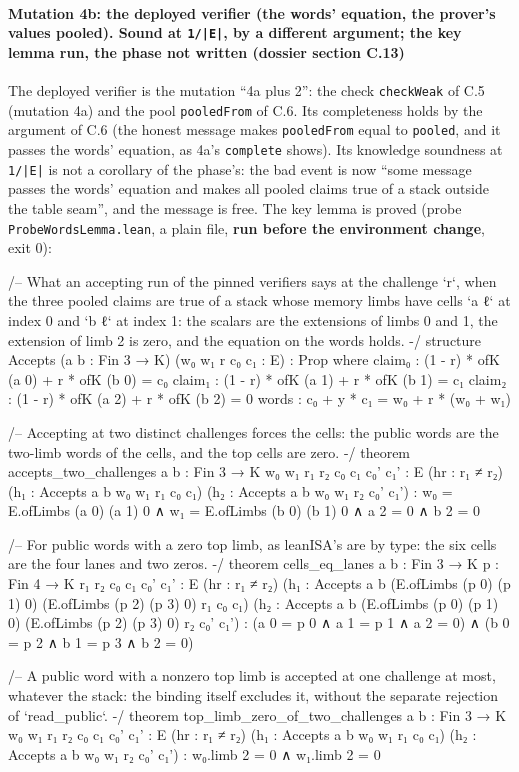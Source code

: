 \paragraph{Mutation 4b: the deployed verifier (the words' equation, the prover's values pooled). Sound at \texttt{1/\allowbreak{}|E|}, by a different argument; the key lemma run, the phase not written (dossier section C.13)}\label{sec:gen-pubinput-C13}

The deployed verifier is the mutation \enquote{4a plus 2}: the check \texttt{checkWeak} of C.5 (mutation 4a) and the pool \texttt{pooledFrom} of C.6. Its completeness holds by the argument of C.6 (the honest message makes \texttt{pooledFrom} equal to \texttt{pooled}, and it passes the words' equation, as 4a's \texttt{complete} shows). Its knowledge soundness at \texttt{1/\allowbreak{}|E|} is not a corollary of the phase's: the bad event is now \enquote{some message passes the words' equation and makes all pooled claims true of a stack outside the table seam}, and the message is free. The key lemma is proved (probe \texttt{ProbeWordsLemma.\allowbreak{}lean}, a plain file, \textbf{run before the environment change}, exit 0):

\begin{leancode}
/-- What an accepting run of the pinned verifiers says at the challenge `r`, when the three
pooled claims are true of a stack whose memory limbs have cells `a ℓ` at index 0 and `b ℓ` at
index 1: the scalars are the extensions of limbs 0 and 1, the extension of limb 2 is zero, and
the equation on the words holds. -/
structure Accepts (a b : Fin 3 → K) (w₀ w₁ r c₀ c₁ : E) : Prop where
  claim₀ : (1 - r) * ofK (a 0) + r * ofK (b 0) = c₀
  claim₁ : (1 - r) * ofK (a 1) + r * ofK (b 1) = c₁
  claim₂ : (1 - r) * ofK (a 2) + r * ofK (b 2) = 0
  words : c₀ + y * c₁ = w₀ + r * (w₀ + w₁)

/-- Accepting at two distinct challenges forces the cells: the public words are the two-limb
words of the cells, and the top cells are zero. -/
theorem accepts_two_challenges {a b : Fin 3 → K} {w₀ w₁ r₁ r₂ c₀ c₁ c₀' c₁' : E}
    (hr : r₁ ≠ r₂) (h₁ : Accepts a b w₀ w₁ r₁ c₀ c₁) (h₂ : Accepts a b w₀ w₁ r₂ c₀' c₁') :
    w₀ = E.ofLimbs (a 0) (a 1) 0 ∧ w₁ = E.ofLimbs (b 0) (b 1) 0 ∧ a 2 = 0 ∧ b 2 = 0

/-- For public words with a zero top limb, as leanISA's are by type: the six cells are the four
lanes and two zeros. -/
theorem cells_eq_lanes {a b : Fin 3 → K} {p : Fin 4 → K} {r₁ r₂ c₀ c₁ c₀' c₁' : E}
    (hr : r₁ ≠ r₂)
    (h₁ : Accepts a b (E.ofLimbs (p 0) (p 1) 0) (E.ofLimbs (p 2) (p 3) 0) r₁ c₀ c₁)
    (h₂ : Accepts a b (E.ofLimbs (p 0) (p 1) 0) (E.ofLimbs (p 2) (p 3) 0) r₂ c₀' c₁') :
    (a 0 = p 0 ∧ a 1 = p 1 ∧ a 2 = 0) ∧ (b 0 = p 2 ∧ b 1 = p 3 ∧ b 2 = 0)

/-- A public word with a nonzero top limb is accepted at one challenge at most, whatever the
stack: the binding itself excludes it, without the separate rejection of `read_public`. -/
theorem top_limb_zero_of_two_challenges {a b : Fin 3 → K} {w₀ w₁ r₁ r₂ c₀ c₁ c₀' c₁' : E}
    (hr : r₁ ≠ r₂) (h₁ : Accepts a b w₀ w₁ r₁ c₀ c₁) (h₂ : Accepts a b w₀ w₁ r₂ c₀' c₁') :
    w₀.limb 2 = 0 ∧ w₁.limb 2 = 0
\end{leancode}

